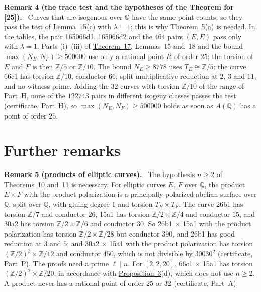 \documentclass[11pt]{article}
\newenvironment{statement}[1]{\par\medskip\noindent\phantomsection\textbf{#1}\ }{\par\medskip}
\newcommand{\Q}{\mathbb Q}
\newcommand{\Z}{\mathbb Z}
\begin{document}
\begin{statement}{Remark 4 (the trace test and the hypotheses of the Theorem for [25]).}\label{rem-trace}
Curves that are isogenous over \(\Q\) have the same point counts, so they pass the test of
\hyperref[lemma-kummer]{Lemma~15}(c) with \(\lambda=1\); this is why \hyperref[thm-isotypic]{Theorem~5}(a) is needed.
In the tables, the pair 165066d1, 165066d2 and the \(464\) pairs \((E,E)\) pass only with \(\lambda=1\). Parts
(i)--(iii) of \hyperref[thm-25]{Theorem~17}, Lemmas~15 and~18 and the bound \(\max(N_E,N_F)\ge500000\) use only a
rational point \(R\) of order \(25\); the torsion of \(E\) and \(F\) is then \(\Z/5\) or \(\Z/10\). The bound
\(N_E\ge8778\) uses \(T_E\cong\Z/5\): the curve 66c1 has torsion \(\Z/10\), conductor \(66\), split multiplicative
reduction at \(2\), \(3\) and \(11\), and no witness prime. Adding the \(32\) curves with torsion \(\Z/10\) of the
range of Part~H, none of the \(122743\) pairs in different isogeny classes passes the test (certificate, Part~H), so
\(\max(N_E,N_F)\ge500000\) holds as soon as \(A(\Q)\) has a point of order \(25\).
\end{statement}

\section{Further remarks}\label{remarks}

\begin{statement}{Remark 5 (products of elliptic curves).}\label{rem-products}
The hypothesis \(n\ge2\) of \hyperref[thm-22212]{Theorems~10} and~\hyperref[thm-228]{11} is necessary. For elliptic
curves \(E\), \(F\) over \(\Q\), the product \(E\times F\) with the product polarization is a principally polarized
abelian surface over \(\Q\), split over \(\Q\), with gluing degree \(1\) and torsion \(T_E\times T_F\). The curve
26b1 has torsion \(\Z/7\) and conductor \(26\), 15a1 has torsion \(\Z/2\times\Z/4\) and conductor \(15\), and 30a2
has torsion \(\Z/2\times\Z/6\) and conductor \(30\). So 26b1 \(\times\) 15a1 with the product polarization has
torsion \(\Z/2\times\Z/28\) but conductor \(390\), and 26b1 has good reduction at \(3\) and \(5\); and 30a2 \(\times\)
15a1 with the product polarization has torsion \((\Z/2)^3\times\Z/12\) and conductor \(450\), which is not divisible
by \(30030^2\) (certificate, Part~P). The proofs need a prime \(\ell\mid n\). For
\([2,2,20]\), 66c1 \(\times\) 15a1 has torsion \((\Z/2)^2\times\Z/20\), in accordance with
\hyperref[prop-parents]{Proposition~3}(d), which does not use \(n\ge2\). A product never has a rational point of order
\(25\) or \(32\) (certificate, Part~A).
\end{statement}
\end{document}
